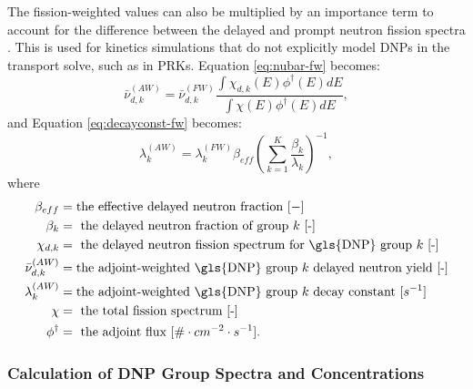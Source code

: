 The fission-weighted values can also be multiplied by an importance term to account for the difference between the delayed and prompt neutron fission spectra \cite{radaideh2019new}.
This is used for kinetics simulations that do not explicitly model \glspl{DNP} in the transport solve, such as in \glspl{PRK}.
Equation \eqref{eq:nubar-fw} becomes:
\begin{equation}
    \bar{\nu}_{d, k}^{(AW)} = \bar{\nu}^{(FW)}_{d, k} \frac{\int \chi_{d, k}(E) \phi^\dagger(E) dE}{\int \chi(E) \phi^\dagger(E) dE},
    \label{eq:yield-fw-import}
\end{equation}
and Equation \eqref{eq:decayconst-fw} becomes:
\begin{equation}
    \lambda_{k}^{(AW)} = \lambda^{(FW)}_{k} \beta_{eff} \left(\sum_{k=1}^K \frac{\beta_k}{\lambda_k} \right)^{-1},
    \label{eq:decay-fw-import}
\end{equation}
where
\begin{align}
    \beta_{eff} &= \text {the effective delayed neutron fraction $[-]$} \nonumber \\
    \beta_{k} &= \text{ the delayed neutron fraction of group $k$ [-]} \nonumber \\
    \chi_{d, k} &= \text{ the delayed neutron fission spectrum for \gls{DNP} group $k$ [-]} \nonumber \\
    \bar{\nu}^{(AW)}_{d, k} &= \text{the adjoint-weighted \gls{DNP} group $k$ delayed neutron yield [-]} \nonumber \\
    \lambda_{k}^{(AW)} &= \text{the adjoint-weighted \gls{DNP} group $k$ decay constant $[s^{-1}]$} \nonumber \\
    \chi &= \text{ the total fission spectrum [-]} \nonumber \\
    \phi^\dagger &= \text{ the adjoint flux $[ \# \cdot cm^{-2} \cdot s^{-1}]$} \nonumber.
\end{align}





\subsubsection{Calculation of DNP Group Spectra and Concentrations}
\label{sec:groupspectra}


